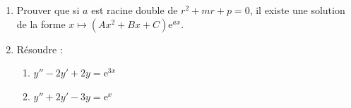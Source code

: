 \documentclass[12pt,a4paper]{article}
\begin{document}
\begin{enumerate}
\begin{enumerate}[label=\alph*)]
        \item Prouver que si $a$ est racine double de $r^{2} + mr + p = 0$, il existe une solution de la forme $x \mapsto (Ax^{2} + Bx + C)\mathrm{e}^{ax}$.
        \item Résoudre :
        \begin{enumerate}[label=\roman*)]
            \item $y'' - 2y' + 2y = \mathrm{e}^{3x}$
            \item $y'' + 2y' - 3y = \mathrm{e}^{x}$
        \end{enumerate}
    \end{enumerate}
\end{enumerate}
\end{document}
